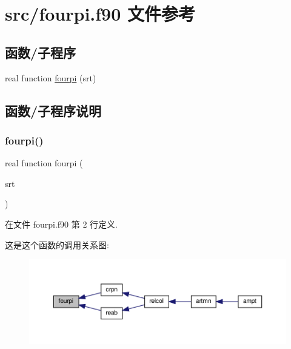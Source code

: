 \hypertarget{fourpi_8f90}{}\section{src/fourpi.f90 文件参考}
\label{fourpi_8f90}
\subsection*{函数/子程序}
\begin{DoxyCompactItemize}
\item 
real function \mbox{\hyperlink{fourpi_8f90_ac15a49f1c6987d517d4090f30d93c409}{fourpi}} (srt)
\end{DoxyCompactItemize}


\subsection{函数/子程序说明}
\mbox{\label{fourpi_8f90_ac15a49f1c6987d517d4090f30d93c409}} 
\subsubsection{\texorpdfstring{fourpi()}{fourpi()}}
{\footnotesize\ttfamily real function fourpi (\begin{DoxyParamCaption}\item[{}]{srt }\end{DoxyParamCaption})}



在文件 fourpi.\+f90 第 2 行定义.

这是这个函数的调用关系图\+:
\nopagebreak
\begin{figure}[H]
\begin{center}
\leavevmode
\includegraphics[width=350pt]{fourpi_8f90_ac15a49f1c6987d517d4090f30d93c409_icgraph}
\end{center}
\end{figure}
